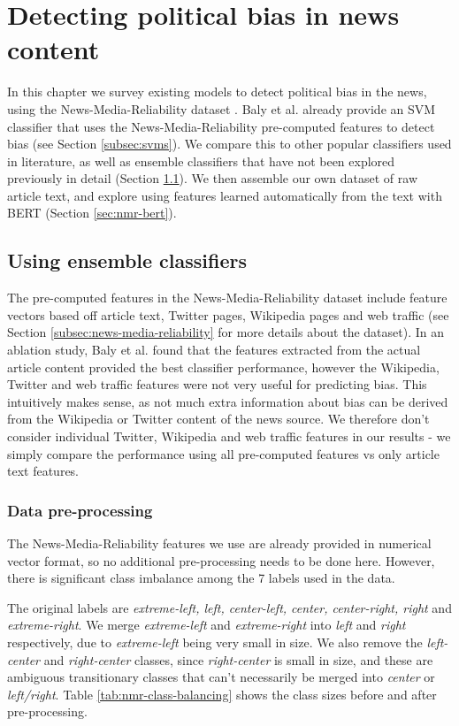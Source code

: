 \chapter{Detecting political bias in news content} \label{chap:ensemble-bert}

In this chapter we survey existing models to detect political bias in the news, using the News-Media-Reliability dataset \cite{news-media-reliability}. Baly et al. already provide an SVM classifier that uses the News-Media-Reliability pre-computed features to detect bias (see Section \ref{subsec:svms}). We compare this to other popular classifiers used in literature, as well as ensemble classifiers that have not been explored previously in detail (Section \ref{sec:nmr-ensemble}). We then assemble our own dataset of raw article text, and explore using features learned automatically from the text with BERT (Section \ref{sec:nmr-bert}).

\section{Using ensemble classifiers} \label{sec:nmr-ensemble}

The pre-computed features in the News-Media-Reliability dataset include feature vectors based off article text, Twitter pages, Wikipedia pages and web traffic (see Section \ref{subsec:news-media-reliability} for more details about the dataset). In an ablation study, Baly et al. found that the features extracted from the actual article content provided the best classifier performance, however the Wikipedia, Twitter and web traffic features were not very useful for predicting bias. This intuitively makes sense, as not much extra information about bias can be derived from the Wikipedia or Twitter content of the news source. We therefore don't consider individual Twitter, Wikipedia and web traffic features in our results - we simply compare the performance using all pre-computed features vs only article text features.

\subsection{Data pre-processing}

The News-Media-Reliability features we use are already provided in numerical vector format, so no additional pre-processing needs to be done here. However, there is significant class imbalance among the 7 labels used in the data.

The original labels are \textit{extreme-left, left, center-left, center, center-right, right} and \textit{extreme-right}. We merge \textit{extreme-left} and \textit{extreme-right} into \textit{left} and \textit{right} respectively, due to \textit{extreme-left} being very small in size. We also remove the \textit{left-center} and \textit{right-center} classes, since \textit{right-center} is small in size, and these are ambiguous transitionary classes that can't necessarily be merged into \textit{center} or \textit{left/right}. Table \ref{tab:nmr-class-balancing} shows the class sizes before and after pre-processing.

